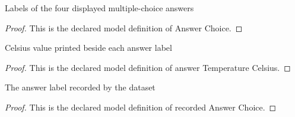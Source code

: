 \begin{definition}
  \label{def:physics:phyx-mini-0373:phyxminiproblems-problemphyxmini0373-answerchoice}
  Labels of the four displayed multiple-choice answers
\end{definition}
\begin{proof}
  This is the declared model definition of Answer Choice.
\end{proof}
\begin{definition}
  \label{def:physics:phyx-mini-0373:phyxminiproblems-problemphyxmini0373-answertemperaturecelsius}
  Celsius value printed beside each answer label
\end{definition}
\begin{proof}
  This is the declared model definition of answer Temperature Celsius.
\end{proof}
\begin{definition}
  \label{def:physics:phyx-mini-0373:phyxminiproblems-problemphyxmini0373-recordedanswerchoice}
  The answer label recorded by the dataset
\end{definition}
\begin{proof}
  This is the declared model definition of recorded Answer Choice.
\end{proof}
